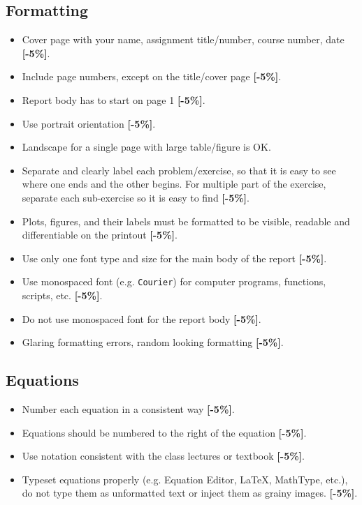 \documentclass{article}
\begin{document}
\subsection{Formatting}
\begin{itemize}
        \item Cover page with your name, assignment title/number, course number, date  {\color{red}\textbf{[-5\%]}}.
        \item     Include page numbers, except on the title/cover page  {\color{red}\textbf{[-5\%]}}.
        \item Report body has to start on page 1  {\color{red}\textbf{[-5\%]}}.
        \item    Use portrait orientation  {\color{red}\textbf{[-5\%]}}.
        \item    Landscape for a single page with large table/figure is OK.
        \item    Separate and clearly label each problem/exercise, so that it is easy to 
                see where one ends and the other begins.  For multiple part of the exercise, 
                separate each sub-exercise so it is easy to find  {\color{red}\textbf{[-5\%]}}.
        \item Plots, figures, and their labels must be formatted to be visible, 
                readable and differentiable on the printout  {\color{red}\textbf{[-5\%]}}.
        \item    Use only one font type and size for the main body of the report  {\color{red}\textbf{[-5\%]}}.
        \item    Use monospaced font (e.g. \texttt{Courier}) for computer programs, 
                functions, scripts, etc.  {\color{red}\textbf{[-5\%]}}.
        \item    Do not use monospaced font for the report body  {\color{red}\textbf{[-5\%]}}.
        \item    Glaring formatting errors, random looking formatting  {\color{red}\textbf{[-5\%]}}.
\end{itemize}

\subsection{Equations}

\begin{itemize}
        \item Number each equation in a consistent way  {\color{red}\textbf{[-5\%]}}.
        \item    Equations should be numbered to the right of the equation  {\color{red}\textbf{[-5\%]}}.
        \item    Use notation consistent with the class lectures or textbook  {\color{red}\textbf{[-5\%]}}.
        \item    Typeset equations properly (e.g. Equation Editor, LaTeX, MathType, etc.), 
do not type them as unformatted text or inject them as grainy images.  {\color{red}\textbf{[-5\%]}}.
\end{itemize}
\end{document}
